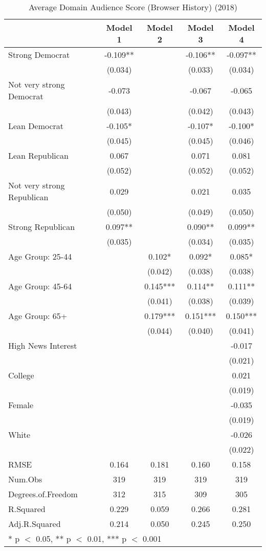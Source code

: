 \begin{table}

\caption{Average Domain Audience Score (Browser History) (2018)}
\centering
\begin{tabular}[t]{lcccc}
\toprule
  & Model 1 & Model 2 & Model 3 & Model 4\\
\midrule
Strong Democrat & -0.109** &  & -0.106** & -0.097**\\
 & (0.034) &  & (0.033) & (0.034)\\
Not very strong Democrat & -0.073 &  & -0.067 & -0.065\\
 & (0.043) &  & (0.042) & (0.043)\\
Lean Democrat & -0.105* &  & -0.107* & -0.100*\\
 & (0.045) &  & (0.045) & (0.046)\\
Lean Republican & 0.067 &  & 0.071 & 0.081\\
 & (0.052) &  & (0.052) & (0.052)\\
Not very strong Republican & 0.029 &  & 0.021 & 0.035\\
 & (0.050) &  & (0.049) & (0.050)\\
Strong Republican & 0.097** &  & 0.090** & 0.099**\\
 & (0.035) &  & (0.034) & (0.035)\\
Age Group: 25-44 &  & 0.102* & 0.092* & 0.085*\\
 &  & (0.042) & (0.038) & (0.038)\\
Age Group: 45-64 &  & 0.145*** & 0.114** & 0.111**\\
 &  & (0.041) & (0.038) & (0.039)\\
Age Group: 65+ &  & 0.179*** & 0.151*** & 0.150***\\
 &  & (0.044) & (0.040) & (0.041)\\
High News Interest &  &  &  & -0.017\\
 &  &  &  & (0.021)\\
College &  &  &  & 0.021\\
 &  &  &  & \vphantom{1} (0.019)\\
Female &  &  &  & -0.035\\
 &  &  &  & (0.019)\\
White &  &  &  & -0.026\\
 &  &  &  & (0.022)\\
\midrule
RMSE & 0.164 & 0.181 & 0.160 & 0.158\\
Num.Obs & 319 & 319 & 319 & 319\\
Degrees.of.Freedom & 312 & 315 & 309 & 305\\
R.Squared & 0.229 & 0.059 & 0.266 & 0.281\\
Adj.R.Squared & 0.214 & 0.050 & 0.245 & 0.250\\
\bottomrule
\multicolumn{5}{l}{\rule{0pt}{1em}* p $<$ 0.05, ** p $<$ 0.01, *** p $<$ 0.001}\\
\end{tabular}
\end{table}
